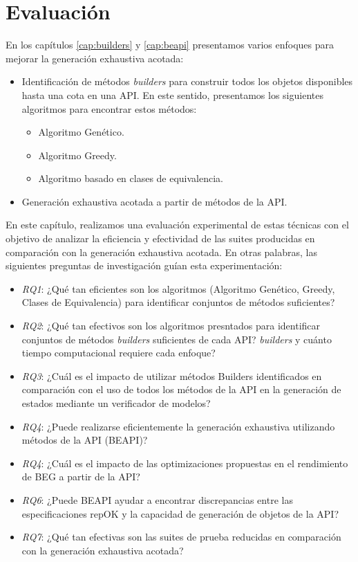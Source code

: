 \chapter[Evaluaci\'on]{Evaluaci\'on}
\label{cap:evaluation}



En los capítulos \ref{cap:builders} y \ref{cap:beapi} presentamos varios enfoques para mejorar la generación exhaustiva acotada:

\begin{itemize}
\item Identificación de métodos \emph{builders} para construir todos los objetos disponibles hasta una cota en una API. En este sentido, presentamos los siguientes algoritmos para encontrar estos métodos:
\begin{itemize}
\item Algoritmo Genético.
\item Algoritmo Greedy.
\item Algoritmo basado en clases de equivalencia.
\end{itemize}
\item Generación exhaustiva acotada a partir de métodos de la API.
\end{itemize}

En este capítulo, realizamos una evaluación experimental de estas técnicas con el objetivo de analizar la eficiencia y efectividad de las suites producidas en comparación con la generación exhaustiva acotada. En otras palabras, las siguientes preguntas de investigación guían esta experimentación:

\begin{itemize}
\item \emph{RQ1}: ¿Qué tan eficientes son los algoritmos (Algoritmo Genético, Greedy, Clases de Equivalencia) para identificar conjuntos de métodos suficientes? 
\item \emph{RQ2}: ¿Qué tan efectivos son los algoritmos presntados para identificar conjuntos de métodos \emph{builders} suficientes de cada API?
\emph{builders} y cuánto tiempo computacional requiere cada enfoque?
\item \emph{RQ3}: ¿Cuál es el impacto de utilizar métodos Builders identificados en comparación con el uso de todos los métodos de la API en la generación de estados mediante un verificador de modelos?
\item \emph{RQ4}: ¿Puede realizarse eficientemente la generación exhaustiva utilizando métodos de la API (BEAPI)?
\item\emph{RQ4}: ¿Cuál es el impacto de las optimizaciones propuestas en el rendimiento de BEG a partir de la API?
\item\emph{RQ6}: ¿Puede BEAPI ayudar a encontrar discrepancias entre las especificaciones repOK y la capacidad de generación de objetos de la API?
\item\emph{RQ7}: ¿Qué tan efectivas son las suites de prueba reducidas en comparación con la generación exhaustiva acotada?
\end{itemize}

